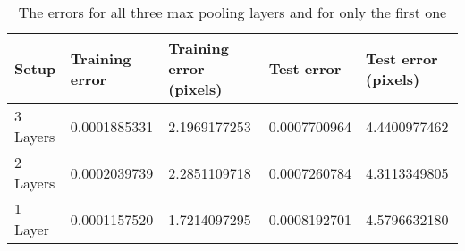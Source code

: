 \begin{table}[h!]
\centering
\footnotesize
\begin{tabular}{|l|l|l|l|l|}
	\hline
		\textbf{Setup} & \textbf{Training error} & \textbf{Training error (pixels)} & \textbf{Test error} & \textbf{Test error (pixels)}\\
	\hline
		3 Layers 	& 0.0001885331%
					& 2.1969177253%
					& 0.0007700964%
					& 4.4400977462%
					\\
	\hline
		2 Layers	& 0.0002039739%
					& 2.2851109718%
					& 0.0007260784%
					& 4.3113349805%
					\\
	\hline
		1 Layer		& 0.0001157520%
					& 1.7214097295%
					& 0.0008192701%
					& 4.5796632180%
					\\
	\hline
	\end{tabular}
	\normalsize
	\caption{The errors for all three max pooling layers and for only the first one}
	\label{tab:cnn_errors_nomaxpooling}
\end{table}
